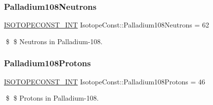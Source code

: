 \subsubsection{\texorpdfstring{Palladium108\+Neutrons}{Palladium108Neutrons}}
{\footnotesize\ttfamily \mbox{\hyperlink{group___isotope_const-_macros_ga5f18360b3e99483a35c32d789e62621c}{I\+S\+O\+T\+O\+P\+E\+C\+O\+N\+S\+T\+\_\+\+I\+NT}} Isotope\+Const\+::\+Palladium108\+Neutrons = 62}

\$ \$ Neutrons in Palladium-\/108. \mbox{\label{group___isotope_const-_palladium-_pd108_ga10b0eca9edb32d4bb560fc6b6796129f}} 
\subsubsection{\texorpdfstring{Palladium108\+Protons}{Palladium108Protons}}
{\footnotesize\ttfamily \mbox{\hyperlink{group___isotope_const-_macros_ga5f18360b3e99483a35c32d789e62621c}{I\+S\+O\+T\+O\+P\+E\+C\+O\+N\+S\+T\+\_\+\+I\+NT}} Isotope\+Const\+::\+Palladium108\+Protons = 46}

\$ \$ Protons in Palladium-\/108. 